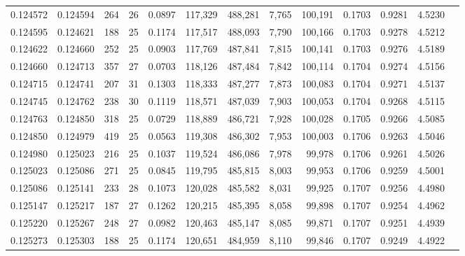 \begin{tabular}{rrrrrrrrrrrrr}
0.124572 & 0.124594 &   264 &  26 &                                     0.0897 & 117,329 & 488,281 &   7,765 & 100,191 & 0.1703 & 0.9281 & 4.5230 \\
0.124595 & 0.124621 &   188 &  25 &                                     0.1174 & 117,517 & 488,093 &   7,790 & 100,166 & 0.1703 & 0.9278 & 4.5212 \\
0.124622 & 0.124660 &   252 &  25 &                                     0.0903 & 117,769 & 487,841 &   7,815 & 100,141 & 0.1703 & 0.9276 & 4.5189 \\
0.124660 & 0.124713 &   357 &  27 &                                     0.0703 & 118,126 & 487,484 &   7,842 & 100,114 & 0.1704 & 0.9274 & 4.5156 \\
0.124715 & 0.124741 &   207 &  31 &                                     0.1303 & 118,333 & 487,277 &   7,873 & 100,083 & 0.1704 & 0.9271 & 4.5137 \\
0.124745 & 0.124762 &   238 &  30 &                                     0.1119 & 118,571 & 487,039 &   7,903 & 100,053 & 0.1704 & 0.9268 & 4.5115 \\
0.124763 & 0.124850 &   318 &  25 &                                     0.0729 & 118,889 & 486,721 &   7,928 & 100,028 & 0.1705 & 0.9266 & 4.5085 \\
0.124850 & 0.124979 &   419 &  25 &                                     0.0563 & 119,308 & 486,302 &   7,953 & 100,003 & 0.1706 & 0.9263 & 4.5046 \\
0.124980 & 0.125023 &   216 &  25 &                                     0.1037 & 119,524 & 486,086 &   7,978 &  99,978 & 0.1706 & 0.9261 & 4.5026 \\
0.125023 & 0.125086 &   271 &  25 &                                     0.0845 & 119,795 & 485,815 &   8,003 &  99,953 & 0.1706 & 0.9259 & 4.5001 \\
0.125086 & 0.125141 &   233 &  28 &                                     0.1073 & 120,028 & 485,582 &   8,031 &  99,925 & 0.1707 & 0.9256 & 4.4980 \\
0.125147 & 0.125217 &   187 &  27 &                                     0.1262 & 120,215 & 485,395 &   8,058 &  99,898 & 0.1707 & 0.9254 & 4.4962 \\
0.125220 & 0.125267 &   248 &  27 &                                     0.0982 & 120,463 & 485,147 &   8,085 &  99,871 & 0.1707 & 0.9251 & 4.4939 \\
0.125273 & 0.125303 &   188 &  25 &                                     0.1174 & 120,651 & 484,959 &   8,110 &  99,846 & 0.1707 & 0.9249 & 4.4922 \\

\end{tabular}
